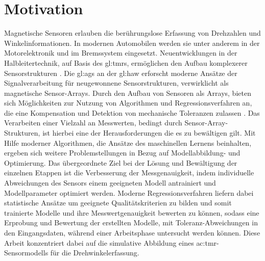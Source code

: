 %

\chapter{Motivation}\label{ch:motivation}


Magnetische Sensoren erlauben die berührungslose Erfassung von Drehzahlen und Winkelinformationen. In modernen Automobilen werden sie unter anderem in der Motorelektronik und im Bremssystem eingesetzt. Neuentwicklungen in der Halbleitertechnik, auf Basis des \gls{gl:tmr}s, ermöglichen den Aufbau komplexerer Sensorstrukturen \cite{Schuethe2019}. Die \gls{gl:ags} an der \gls{gl:haw} erforscht moderne Ansätze der Signalverarbeitung für neugewonnene Sensorstrukturen, verwirklicht als magnetische Sensor-Arrays. Durch den Aufbau von Sensoren als Arrays, bieten sich Möglichkeiten zur Nutzung von Algorithmen und Regressionsverfahren an, die eine Kompensation und Detektion von mechanische Toleranzen zulassen \cite{Schuethe2020}.
\newline
Das Verarbeiten einer Vielzahl an Messwerten, bedingt durch Sensor-Array-Strukturen, ist hierbei eine der Herausforderungen die es zu bewältigen gilt. Mit Hilfe moderner Algorithmen, die Ansätze des maschinellen Lernens beinhalten, ergeben sich weitere Problemstellungen in Bezug auf Modellabbildung- und Optimierung.
Das übergeordnete Ziel bei der Lösung und Bewältigung der einzelnen Etappen ist die Verbesserung der Messgenauigkeit, indem individuelle Abweichungen des Sensors einem geeigneten Modell antrainiert und Modellparameter optimiert werden.
\newline
Moderne Regressionsverfahren liefern dabei statistische Ansätze um geeignete Qualitätskriterien zu bilden und somit trainierte Modelle und ihre Messwertgenauigkeit bewerten zu können, sodass eine Erprobung und Bewertung der erstellten Modelle, mit Toleranz-Abweichungen in den Eingangsdaten, während einer Arbeitsphase untersucht werden können.
Diese Arbeit konzentriert dabei auf die simulative Abbildung eines \gls{ac:tmr}-Sensormodells für die Drehwinkelerfassung.


\clearpage



